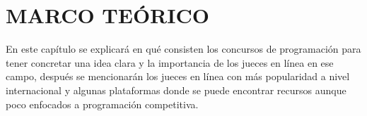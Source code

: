 \newpage
\chapter{MARCO TEÓRICO}

En este capítulo se explicará en qué consisten los concursos de programación para tener concretar una idea clara y la importancia de los jueces en línea en ese campo, después se mencionarán los jueces en línea con más popularidad a nivel internacional y algunas plataformas donde se puede encontrar recursos aunque poco enfocados a programación competitiva.






